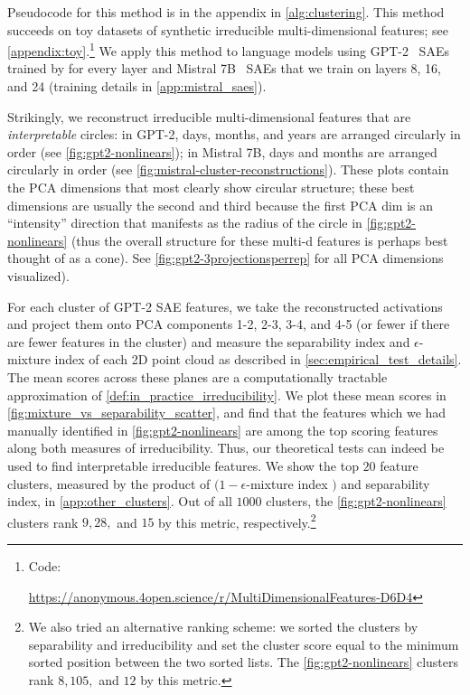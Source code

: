 \documentclass{article} %
\DeclareRobustCommand{\revOne}[1]{#1}
\newif\ifpublicversion
\newcommand{\revise}[2]{%
    \ifpublicversion
        #1  %
    \else
        #2  %
    \fi
}
\theoremstyle{plain}
\theoremstyle{definition}
\begin{document}
Pseudocode for this method is in the appendix in \cref{alg:clustering}. This method succeeds on toy datasets of synthetic irreducible multi-dimensional features; see \cref{appendix:toy}.\footnote{Code: 
\revise{\url{https://github.com/JoshEngels/MultiDimensionalFeatures}}{\url{https://anonymous.4open.science/r/MultiDimensionalFeatures-D6D4}}}
We apply this method to language models using GPT-2~\citep{gpt_2} SAEs trained by \cite{bloom2024gpt2residualsaes} for every layer and Mistral 7B~\citep{mistral_7b} SAEs that we train on layers 8, 16, and 24 (training details in \cref{app:mistral_saes}). 

Strikingly, we reconstruct irreducible multi-dimensional features that are \textit{interpretable} circles: in GPT-2, days, months, and years are arranged circularly in order (see \cref{fig:gpt2-nonlinears}); in Mistral 7B, days and months are arranged circularly in order (see \cref{fig:mistral-cluster-reconstructions}). \revOne{These plots contain the PCA dimensions that most clearly show circular structure; these best dimensions are usually the second and third because the first PCA dim is an ``intensity'' direction that manifests as the radius of the circle in \cref{fig:gpt2-nonlinears} (thus the overall structure for these multi-d features is perhaps best thought of as a cone). See \cref{fig:gpt2-3projectionsperrep} for all PCA dimensions visualized).}
 
For each cluster of GPT-2 SAE features, we take the reconstructed activations and project them onto PCA components 1-2, 2-3, 3-4, and 4-5 (or fewer if there are fewer features in the cluster) and measure the separability index and $\epsilon$-mixture index of each 2D point cloud as described in \cref{sec:empirical_test_details}. The mean scores across these planes are a computationally tractable approximation of \cref{def:in_practice_irreducibility}. We plot these mean scores in \cref{fig:mixture_vs_separability_scatter}, and find that the features which we had manually identified in \cref{fig:gpt2-nonlinears} are among the top scoring features along both measures of irreducibility. Thus, our theoretical tests can indeed be used to find interpretable irreducible features. We show the top $20$ feature clusters, measured by the product of $(1 - \epsilon$-mixture index $)$ and separability index, in \cref{app:other_clusters}. Out of all $1000$ clusters, the \cref{fig:gpt2-nonlinears} clusters rank $9, 28,$ and $15$ by this metric, respectively.\footnote{We also tried an alternative ranking scheme: we sorted the clusters by  separability and irreducibility and set the cluster score equal to the minimum sorted position between the two sorted lists. The \cref{fig:gpt2-nonlinears} clusters rank $8, 105, $ and $12$ by this metric.}
\end{document}
